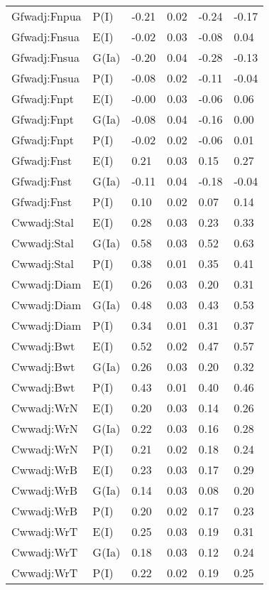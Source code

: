 \begin{center}
\begin{longtable}{|p{1.1in}|p{0.7in}|p{0.7in}|p{0.6in}|p{0.6in}|p{0.6in}|}
  Gfwadj:Fnpua & P(I) & -0.21 & 0.02 & -0.24 & -0.17 \\ 
  Gfwadj:Fnsua & E(I) & -0.02 & 0.03 & -0.08 & 0.04 \\ 
  Gfwadj:Fnsua & G(Ia) & -0.20 & 0.04 & -0.28 & -0.13 \\ 
  Gfwadj:Fnsua & P(I) & -0.08 & 0.02 & -0.11 & -0.04 \\ 
  Gfwadj:Fnpt & E(I) & -0.00 & 0.03 & -0.06 & 0.06 \\ 
  Gfwadj:Fnpt & G(Ia) & -0.08 & 0.04 & -0.16 & 0.00 \\ 
  Gfwadj:Fnpt & P(I) & -0.02 & 0.02 & -0.06 & 0.01 \\ 
  Gfwadj:Fnst & E(I) & 0.21 & 0.03 & 0.15 & 0.27 \\ 
  Gfwadj:Fnst & G(Ia) & -0.11 & 0.04 & -0.18 & -0.04 \\ 
  Gfwadj:Fnst & P(I) & 0.10 & 0.02 & 0.07 & 0.14 \\ 
  Cwwadj:Stal & E(I) & 0.28 & 0.03 & 0.23 & 0.33 \\ 
  Cwwadj:Stal & G(Ia) & 0.58 & 0.03 & 0.52 & 0.63 \\ 
  Cwwadj:Stal & P(I) & 0.38 & 0.01 & 0.35 & 0.41 \\ 
  Cwwadj:Diam & E(I) & 0.26 & 0.03 & 0.20 & 0.31 \\ 
  Cwwadj:Diam & G(Ia) & 0.48 & 0.03 & 0.43 & 0.53 \\ 
  Cwwadj:Diam & P(I) & 0.34 & 0.01 & 0.31 & 0.37 \\ 
  Cwwadj:Bwt & E(I) & 0.52 & 0.02 & 0.47 & 0.57 \\ 
  Cwwadj:Bwt & G(Ia) & 0.26 & 0.03 & 0.20 & 0.32 \\ 
  Cwwadj:Bwt & P(I) & 0.43 & 0.01 & 0.40 & 0.46 \\ 
  Cwwadj:WrN & E(I) & 0.20 & 0.03 & 0.14 & 0.26 \\ 
  Cwwadj:WrN & G(Ia) & 0.22 & 0.03 & 0.16 & 0.28 \\ 
  Cwwadj:WrN & P(I) & 0.21 & 0.02 & 0.18 & 0.24 \\ 
  Cwwadj:WrB & E(I) & 0.23 & 0.03 & 0.17 & 0.29 \\ 
  Cwwadj:WrB & G(Ia) & 0.14 & 0.03 & 0.08 & 0.20 \\ 
  Cwwadj:WrB & P(I) & 0.20 & 0.02 & 0.17 & 0.23 \\ 
  Cwwadj:WrT & E(I) & 0.25 & 0.03 & 0.19 & 0.31 \\ 
  Cwwadj:WrT & G(Ia) & 0.18 & 0.03 & 0.12 & 0.24 \\ 
  Cwwadj:WrT & P(I) & 0.22 & 0.02 & 0.19 & 0.25 \\ 

\end{longtable}
\end{center}
